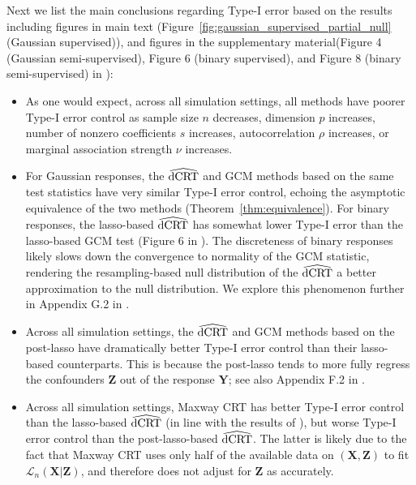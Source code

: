 \documentclass[aos]{imsart}
\theoremstyle{plain}
\theoremstyle{remark}
\newcommand{\prx}{\bm X}								%
\newcommand{\prz}{\bm Z}								%
\newcommand{\pry}{{\bm Y}}								%
\newcommand{\law}{\mathcal L}							%
\newcommand{\dCRThat}{\widehat{\textnormal{dCRT}}}		%
\begin{document}
Next we list the main conclusions regarding Type-I error based on the results including figures in main text (Figure~\ref{fig:gaussian_supervised_partial_null} (Gaussian supervised)), and figures in the supplementary material(Figure 4 (Gaussian semi-supervised), Figure 6 (binary supervised), and Figure 8 (binary semi-supervised) in \cite{supplementary}): 
\begin{itemize}
    \item As one would expect, across all simulation settings, all methods have poorer Type-I error control as sample size $n$ decreases, dimension $p$ increases, number of nonzero coefficients $s$ increases, autocorrelation $\rho$ increases, or marginal association strength $\nu$ increases.
    \item For Gaussian responses, the $\dCRThat$ and GCM methods based on the same test statistics have very similar Type-I error control, echoing the asymptotic equivalence of the two methods (Theorem~\ref{thm:equivalence}). For binary responses, the lasso-based $\dCRThat$ has somewhat lower Type-I error than the lasso-based GCM test (Figure 6 in \cite{supplementary}). The discreteness of binary responses likely slows down the convergence to normality of the GCM statistic, rendering the resampling-based null distribution of the $\dCRThat$ a better approximation to the null distribution. We explore this phenomenon further in Appendix G.2 in \cite{supplementary}.
    \item Across all simulation settings, the $\dCRThat$ and GCM methods based on the post-lasso have dramatically better Type-I error control than their lasso-based counterparts. This is because the post-lasso tends to more fully regress the confounders $\prz$ out of the response $\pry$; see also Appendix F.2 in \cite{supplementary}.
    \item Across all simulation settings, Maxway CRT has better Type-I error control than the lasso-based $\dCRThat$ (in line with the results of \cite{Li2022}), but worse Type-I error control than the post-lasso-based $\dCRThat$. The latter is likely due to the fact that Maxway CRT uses only half of the available data on $(\prx, \prz)$ to fit $\law_n(\prx|\prz)$, and therefore does not adjust for $\prz$ as accurately.
\end{itemize}
\end{document}
